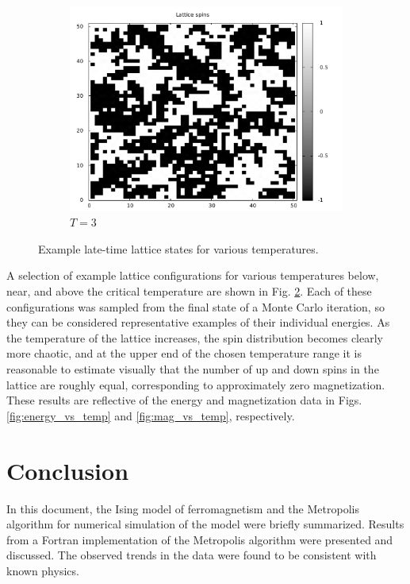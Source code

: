 \documentclass[]{article}
\begin{document}
\begin{figure}[ht!]
\begin{subfigure}[b]{0.3\linewidth}
  \includegraphics[width=\textwidth]{figures/spin_T_eq_3.pdf}
  \caption{$T=3$}
  \label{fig:spin_t_eq_3}
 \end{subfigure}
 
 \caption{Example late-time lattice states for various temperatures.}
 \label{fig:spins}
\end{figure}

A selection of example lattice configurations for various temperatures below, near, and above the critical temperature are shown in Fig. \ref{fig:spins}. Each of these configurations was sampled from the final state of a Monte Carlo iteration, so they can be considered representative examples of their individual energies. As the temperature of the lattice increases, the spin distribution becomes clearly more chaotic, and at the upper end of the chosen temperature range it is reasonable to estimate visually that the number of up and down spins in the lattice are roughly equal, corresponding to approximately zero magnetization. These results are reflective of the energy and magnetization data in Figs. \ref{fig:energy_vs_temp} and \ref{fig:mag_vs_temp}, respectively.

\section{Conclusion}

In this document, the Ising model of ferromagnetism and the Metropolis algorithm for numerical simulation of the model were briefly summarized. Results from a Fortran implementation of the Metropolis algorithm were presented and discussed. The observed trends in the data were found to be consistent with known physics.
\end{document}
